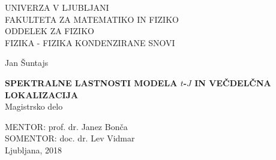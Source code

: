 
\def\epsfg#1#2{\epsfig{file=#1.eps,width=#2}}
\def\legendamp#1#2{\vbox{\hsize=#1\caption{\small #2}}}

\setcounter{topnumber}{4}
\setcounter{bottomnumber}{4}
\setcounter{totalnumber}{5}
\renewcommand{\topfraction}{0.99}
\renewcommand{\bottomfraction}{0.99}
\renewcommand{\textfraction}{0.0}
\setlength{\tabcolsep}{10pt}
\renewcommand{\arraystretch}{1.5}

\def\bi#1{\hbox{\boldmath{$#1$}}}
\let\oldvec\vec
\def\vec#1{\mbox{\boldmath$#1$}}
\def\pol{{\textstyle{1\over2}}}
\def\svec#1{\mbox{{\scriptsize \boldmath$#1$}}}




\pagestyle{empty}
\begin{center}

{\large UNIVERZA V LJUBLJANI\\
FAKULTETA ZA MATEMATIKO IN FIZIKO\\
ODDELEK ZA FIZIKO\\
FIZIKA - FIZIKA KONDENZIRANE SNOVI\\}


\vspace{4cm}


{\Large Jan Šuntajs\\}

\vspace{10mm}

{\bf \Large SPEKTRALNE LASTNOSTI MODELA $t$-$J$ IN VEČDELČNA LOKALIZACIJA}\\
\vspace{5mm}
{\large Magistrsko delo}\\




\vfill



{\large MENTOR: prof. dr. Janez Bonča\\
SOMENTOR: doc. dr. Lev Vidmar\\


\vspace{2cm}
Ljubljana, 2018}

\end{center}

